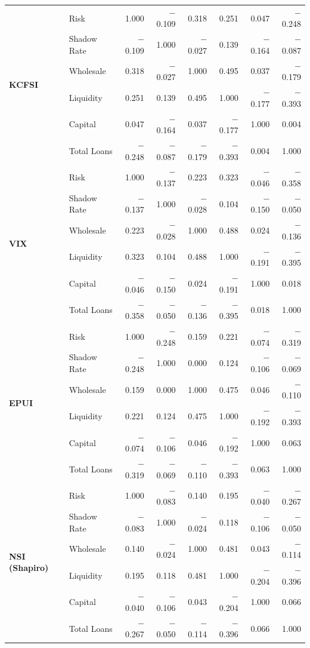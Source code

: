 \documentclass[12pt,a4paper]{report}\usepackage[a4paper, top=2.5cm, bottom=2.5cm, left=2.5cm, right=2.5cm]{geometry}
\begin{document}
\begin{table}[H]
{\begin{tabular}{ll rrrrrr}
\multirow{6}{*}{\textbf{KCFSI}}
 & Risk          &  1.000 & $-$0.109 &  0.318 &  0.251 &  0.047 & $-$0.248 \\
 & Shadow Rate   & $-$0.109 &  1.000 & $-$0.027 &  0.139 & $-$0.164 & $-$0.087 \\
 & Wholesale     &  0.318 & $-$0.027 &  1.000 &  0.495 &  0.037 & $-$0.179 \\
 & Liquidity     &  0.251 &  0.139 &  0.495 &  1.000 & $-$0.177 & $-$0.393 \\
 & Capital       &  0.047 & $-$0.164 &  0.037 & $-$0.177 &  1.000 &  0.004 \\
 & Total Loans   & $-$0.248 & $-$0.087 & $-$0.179 & $-$0.393 &  0.004 &  1.000 \\
\midrule

\multirow{6}{*}{\textbf{VIX}}
 & Risk          &  1.000 & $-$0.137 &  0.223 &  0.323 & $-$0.046 & $-$0.358 \\
 & Shadow Rate   & $-$0.137 &  1.000 & $-$0.028 &  0.104 & $-$0.150 & $-$0.050 \\
 & Wholesale     &  0.223 & $-$0.028 &  1.000 &  0.488 &  0.024 & $-$0.136 \\
 & Liquidity     &  0.323 &  0.104 &  0.488 &  1.000 & $-$0.191 & $-$0.395 \\
 & Capital       & $-$0.046 & $-$0.150 &  0.024 & $-$0.191 &  1.000 &  0.018 \\
 & Total Loans   & $-$0.358 & $-$0.050 & $-$0.136 & $-$0.395 &  0.018 &  1.000 \\
\midrule

\multirow{6}{*}{\textbf{EPUI}}
 & Risk          &  1.000 & $-$0.248 &  0.159 &  0.221 & $-$0.074 & $-$0.319 \\
 & Shadow Rate   & $-$0.248 &  1.000 &  0.000 &  0.124 & $-$0.106 & $-$0.069 \\
 & Wholesale     &  0.159 &  0.000 &  1.000 &  0.475 &  0.046 & $-$0.110 \\
 & Liquidity     &  0.221 &  0.124 &  0.475 &  1.000 & $-$0.192 & $-$0.393 \\
 & Capital       & $-$0.074 & $-$0.106 &  0.046 & $-$0.192 &  1.000 &  0.063 \\
 & Total Loans   & $-$0.319 & $-$0.069 & $-$0.110 & $-$0.393 &  0.063 &  1.000 \\
\midrule

\multirow{6}{*}{\textbf{NSI (Shapiro)}}
 & Risk          &  1.000 & $-$0.083 &  0.140 &  0.195 & $-$0.040 & $-$0.267 \\
 & Shadow Rate   & $-$0.083 &  1.000 & $-$0.024 &  0.118 & $-$0.106 & $-$0.050 \\
 & Wholesale     &  0.140 & $-$0.024 &  1.000 &  0.481 &  0.043 & $-$0.114 \\
 & Liquidity     &  0.195 &  0.118 &  0.481 &  1.000 & $-$0.204 & $-$0.396 \\
 & Capital       & $-$0.040 & $-$0.106 &  0.043 & $-$0.204 &  1.000 &  0.066 \\
 & Total Loans   & $-$0.267 & $-$0.050 & $-$0.114 & $-$0.396 &  0.066 &  1.000 \\
\midrule


\end{tabular}}
\end{table}
\end{document}
